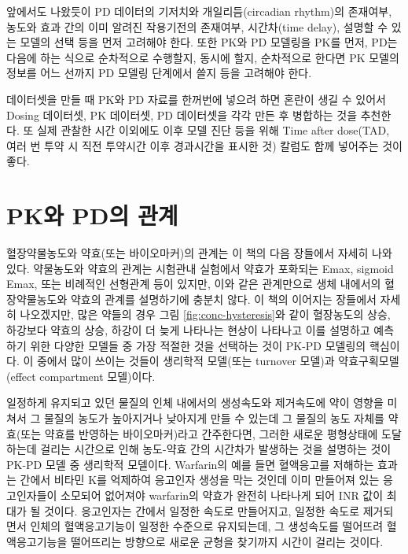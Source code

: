 \documentclass[
  10pt,
  krantz2,
  a4paper]{krantz}
\theoremstyle{definition}
\theoremstyle{definition}
\theoremstyle{definition}
\theoremstyle{remark}
\begin{document}
앞에서도 나왔듯이 PD 데이터의 기저치와 개일리듬(circadian rhythm)의 존재여부, 농도와 효과 간의 이미 알려진 작용기전의 존재여부, 시간차(time delay), 설명할 수 있는 모델의 선택 등을 먼저 고려해야 한다. 또한 PK와 PD 모델링을 PK를 먼저, PD는 다음에 하는 식으로 순차적으로 수행할지, 동시에 할지, 순차적으로 한다면 PK 모델의 정보를 어느 선까지 PD 모델링 단계에서 쓸지 등을 고려해야 한다.

데이터셋을 만들 때 PK와 PD 자료를 한꺼번에 넣으려 하면 혼란이 생길 수 있어서 Dosing 데이터셋, PK 데이터셋, PD 데이터셋을 각각 만든 후 병합하는 것을 추천한다. 또 실제 관찰한 시간 이외에도 이후 모델 진단 등을 위해 Time after dose(TAD, 여러 번 투약 시 직전 투약시간 이후 경과시간을 표시한 것) 칼럼도 함께 넣어주는 것이 좋다.

\hypertarget{pkuxc640-pduxc758-uxad00uxacc4}{%
\section{PK와 PD의 관계}\label{pkuxc640-pduxc758-uxad00uxacc4}}

혈장약물농도와 약효(또는 바이오마커)의 관계는 이 책의 다음 장들에서 자세히 나와 있다. 약물농도와 약효의 관계는 시험관내 실험에서 약효가 포화되는 Emax, sigmoid Emax, 또는 비례적인 선형관계 등이 있지만, 이와 같은 관계만으로 생체 내에서의 혈장약물농도와 약효의 관계를 설명하기에 충분치 않다. 이 책의 이어지는 장들에서 자세히 나오겠지만, 많은 약들의 경우 그림 \ref{fig:conc-hysteresis}와 같이 혈장농도의 상승, 하강보다 약효의 상승, 하강이 더 늦게 나타나는 현상이 나타나고 이를 설명하고 예측하기 위한 다양한 모델들 중 가장 적절한 것을 선택하는 것이 PK-PD 모델링의 핵심이다. 이 중에서 많이 쓰이는 것들이 생리학적 모델(또는 turnover 모델)과 약효구획모델(effect compartment 모델)이다.

일정하게 유지되고 있던 물질의 인체 내에서의 생성속도와 제거속도에 약이 영향을 미쳐서 그 물질의 농도가 높아지거나 낮아지게 만들 수 있는데 그 물질의 농도 자체를 약효(또는 약효를 반영하는 바이오마커)라고 간주한다면, 그러한 새로운 평형상태에 도달하는데 걸리는 시간으로 인해 농도-약효 간의 시간차가 발생하는 것을 설명하는 것이 PK-PD 모델 중 생리학적 모델이다. Warfarin의 예를 들면 혈액응고를 저해하는 효과는 간에서 비타민 K를 억제하여 응고인자 생성을 막는 것인데 이미 만들어져 있는 응고인자들이 소모되어 없어져야 warfarin의 약효가 완전히 나타나게 되어 INR 값이 최대가 될 것이다. 응고인자는 간에서 일정한 속도로 만들어지고, 일정한 속도로 제거되면서 인체의 혈액응고기능이 일정한 수준으로 유지되는데, 그 생성속도를 떨어뜨려 혈액응고기능을 떨어뜨리는 방향으로 새로운 균형을 찾기까지 시간이 걸리는 것이다.
\end{document}
